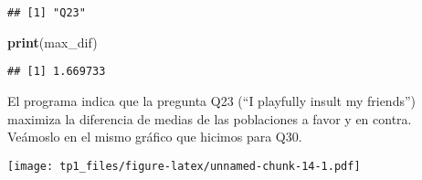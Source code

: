 \documentclass[
]{article}
\newenvironment{Shaded}{\begin{snugshade}}{\end{snugshade}}
\newcommand{\AttributeTok}[1]{\textcolor[rgb]{0.13,0.29,0.53}{#1}}
\newcommand{\DecValTok}[1]{\textcolor[rgb]{0.00,0.00,0.81}{#1}}
\newcommand{\FunctionTok}[1]{\textcolor[rgb]{0.13,0.29,0.53}{\textbf{#1}}}
\newcommand{\NormalTok}[1]{#1}
\newcommand{\OtherTok}[1]{\textcolor[rgb]{0.56,0.35,0.01}{#1}}
\newcommand{\SpecialCharTok}[1]{\textcolor[rgb]{0.81,0.36,0.00}{\textbf{#1}}}
\newcommand{\StringTok}[1]{\textcolor[rgb]{0.31,0.60,0.02}{#1}}
\begin{document}
\begin{verbatim}
## [1] "Q23"
\end{verbatim}

\begin{Shaded}
\begin{Highlighting}[]
\FunctionTok{print}\NormalTok{(max\_dif)}
\end{Highlighting}
\end{Shaded}

\begin{verbatim}
## [1] 1.669733
\end{verbatim}

El programa indica que la pregunta Q23 (``I playfully insult my
friends'') maximiza la diferencia de medias de las poblaciones a favor y
en contra. Veámoslo en el mismo gráfico que hicimos para Q30.

\begin{Shaded}
\end{Shaded}

\texttt{[image: tp1\_files/figure-latex/unnamed-chunk-14-1.pdf]}

\begin{Shaded}
\end{Shaded}
\end{document}
